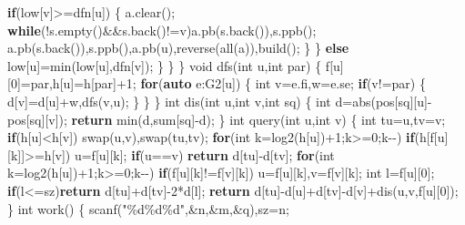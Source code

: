 \documentclass[
]{article}
\newenvironment{Shaded}{}{}
\newcommand{\ControlFlowTok}[1]{\textcolor[rgb]{0.00,0.44,0.13}{\textbf{#1}}}
\newcommand{\DataTypeTok}[1]{\textcolor[rgb]{0.56,0.13,0.00}{#1}}
\newcommand{\DecValTok}[1]{\textcolor[rgb]{0.25,0.63,0.44}{#1}}
\newcommand{\KeywordTok}[1]{\textcolor[rgb]{0.00,0.44,0.13}{\textbf{#1}}}
\newcommand{\NormalTok}[1]{#1}
\newcommand{\SpecialCharTok}[1]{\textcolor[rgb]{0.25,0.44,0.63}{#1}}
\newcommand{\StringTok}[1]{\textcolor[rgb]{0.25,0.44,0.63}{#1}}
\begin{document}
\begin{Shaded}
\begin{Highlighting}[]
                \ControlFlowTok{if}\NormalTok{(low[v]\textgreater{}=dfn[u])}
\NormalTok{                \{}
\NormalTok{                    a.clear(); }\ControlFlowTok{while}\NormalTok{(!s.empty()\&\&s.back()!=v)a.pb(s.back()),s.ppb();}
\NormalTok{                    a.pb(s.back()),s.ppb(),a.pb(u),reverse(all(a)),build();}
\NormalTok{                \}}
\NormalTok{            \}}
            \ControlFlowTok{else}\NormalTok{ low[u]=min(low[u],dfn[v]);}
\NormalTok{        \}}
\NormalTok{    \}}
\NormalTok{\}}
\DataTypeTok{void}\NormalTok{ dfs(}\DataTypeTok{int}\NormalTok{ u,}\DataTypeTok{int}\NormalTok{ par)}
\NormalTok{\{}
\NormalTok{    f[u][}\DecValTok{0}\NormalTok{]=par,h[u]=h[par]+}\DecValTok{1}\NormalTok{;}
    \ControlFlowTok{for}\NormalTok{(}\KeywordTok{auto}\NormalTok{ e:G2[u])}
\NormalTok{    \{}
        \DataTypeTok{int}\NormalTok{ v=e.fi,w=e.se;}
        \ControlFlowTok{if}\NormalTok{(v!=par)}
\NormalTok{        \{}
\NormalTok{            d[v]=d[u]+w,dfs(v,u);}
\NormalTok{        \}}
\NormalTok{    \}}
\NormalTok{\}}
\DataTypeTok{int}\NormalTok{ dis(}\DataTypeTok{int}\NormalTok{ u,}\DataTypeTok{int}\NormalTok{ v,}\DataTypeTok{int}\NormalTok{ sq)}
\NormalTok{\{}
    \DataTypeTok{int}\NormalTok{ d=abs(pos[sq][u]{-}pos[sq][v]);}
    \ControlFlowTok{return}\NormalTok{ min(d,sum[sq]{-}d);}
\NormalTok{\}}
\DataTypeTok{int}\NormalTok{ query(}\DataTypeTok{int}\NormalTok{ u,}\DataTypeTok{int}\NormalTok{ v)}
\NormalTok{\{}
    \DataTypeTok{int}\NormalTok{ tu=u,tv=v; }\ControlFlowTok{if}\NormalTok{(h[u]\textless{}h[v]) swap(u,v),swap(tu,tv);}
    \ControlFlowTok{for}\NormalTok{(}\DataTypeTok{int}\NormalTok{ k=log2(h[u])+}\DecValTok{1}\NormalTok{;k\textgreater{}=}\DecValTok{0}\NormalTok{;k{-}{-})}
        \ControlFlowTok{if}\NormalTok{(h[f[u][k]]\textgreater{}=h[v])}
\NormalTok{            u=f[u][k];}
    \ControlFlowTok{if}\NormalTok{(u==v) }\ControlFlowTok{return}\NormalTok{ d[tu]{-}d[tv];}
    \ControlFlowTok{for}\NormalTok{(}\DataTypeTok{int}\NormalTok{ k=log2(h[u])+}\DecValTok{1}\NormalTok{;k\textgreater{}=}\DecValTok{0}\NormalTok{;k{-}{-})}
        \ControlFlowTok{if}\NormalTok{(f[u][k]!=f[v][k])}
\NormalTok{            u=f[u][k],v=f[v][k];}
    \DataTypeTok{int}\NormalTok{ l=f[u][}\DecValTok{0}\NormalTok{];}
    \ControlFlowTok{if}\NormalTok{(l\textless{}=sz)}\ControlFlowTok{return}\NormalTok{ d[tu]+d[tv]{-}}\DecValTok{2}\NormalTok{*d[l];}
    \ControlFlowTok{return}\NormalTok{ d[tu]{-}d[u]+d[tv]{-}d[v]+dis(u,v,f[u][}\DecValTok{0}\NormalTok{]);}
\NormalTok{\}}
\DataTypeTok{int}\NormalTok{ work()}
\NormalTok{\{}
\NormalTok{    scanf(}\StringTok{"}\SpecialCharTok{\%d\%d\%d}\StringTok{"}\NormalTok{,\&n,\&m,\&q),sz=n;}

\end{Highlighting}
\end{Shaded}
\end{document}
